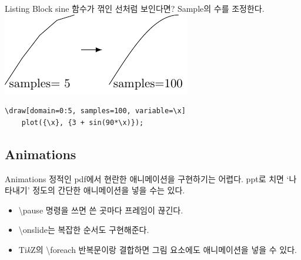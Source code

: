 \documentclass[12pt]{gshs_beamer_class}
\begin{document}
\begin{frame}[t, fragile]{Listing Block}
	sine 함수가 꺾인 선처럼 보인다면? Sample의 수를 조정한다.\\
	\vspace{5pt}
	\centering
	\includegraphics[width=0.5\linewidth]{./figures/samplenumbers.pdf}
	
	\begin{block}{}
		\begin{lstlisting}
\draw[domain=0:5, samples=100, variable=\x] 
	plot({\x}, {3 + sin(90*\x)});
		\end{lstlisting}
	\end{block}
\end{frame}

\subsection{Animations}
\begin{frame}[t]{Animations}
	정적인 pdf에서 현란한 애니메이션을 구현하기는 어렵다. ppt로 치면 `나타내기' 정도의 간단한 애니메이션을 넣을 수는 있다.
	
	\begin{itemize} \pause
		\item \textbackslash pause 명령을 쓰면 쓴 곳마다 프레임이 끊긴다. \pause
		\item \textbackslash onslide는 복잡한 순서도 구현해준다. \pause
		\item Ti\textit{k}Z의 \textbackslash foreach 반복문이랑 결합하면 그림 요소에도 애니메이션을 넣을 수 있다.	
	\end{itemize}

\end{frame}
\end{document}
